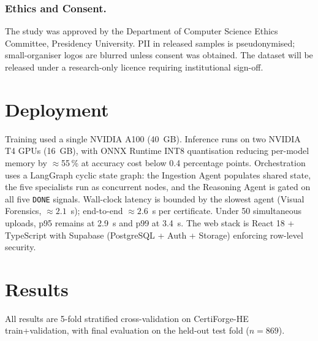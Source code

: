\documentclass[runningheads]{llncs}
\begin{document}
\subsubsection{Ethics and Consent.} The study was approved by the Department of Computer Science Ethics Committee, Presidency University. PII in released samples is pseudonymised; small-organiser logos are blurred unless consent was obtained. The dataset will be released under a research-only licence requiring institutional sign-off.

\section{Deployment}
\label{sec:deployment}

Training used a single NVIDIA A100 (40~GB). Inference runs on two NVIDIA T4 GPUs (16~GB), with ONNX Runtime INT8 quantisation reducing per-model memory by $\approx$55\,\% at accuracy cost below 0.4 percentage points. Orchestration uses a LangGraph cyclic state graph: the Ingestion Agent populates shared state, the five specialists run as concurrent nodes, and the Reasoning Agent is gated on all five \texttt{DONE} signals. Wall-clock latency is bounded by the slowest agent (Visual Forensics, $\approx 2.1$~s); end-to-end $\approx 2.6$~s per certificate. Under 50 simultaneous uploads, p95 remains at 2.9~s and p99 at 3.4~s. The web stack is React 18 + TypeScript with Supabase (PostgreSQL + Auth + Storage) enforcing row-level security.

\section{Results}
\label{sec:results}

All results are 5-fold stratified cross-validation on CertiForge-HE train+validation, with final evaluation on the held-out test fold ($n = 869$).
\end{document}
